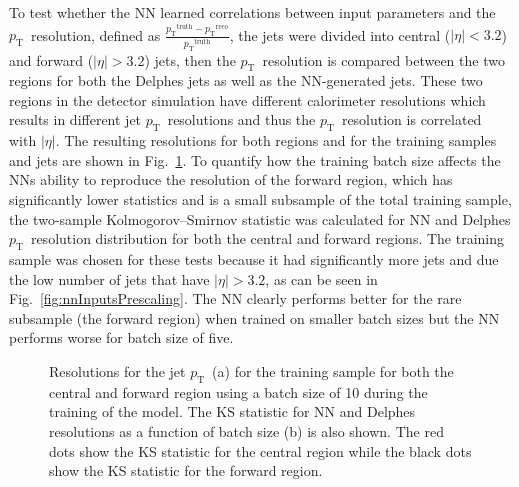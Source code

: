 \documentclass[showpacs,showkeys,preprint,prd,nofootinbib,linenumbers,12pt]{revtex4-1}
\def\pt{\ensuremath{p_{\mathrm{T}}}}
\def\ptRes{\ensuremath{\pt^{\mathrm{truth}}-\pt^{\mathrm{reco}}}}
\begin{document}
To test whether the NN learned correlations between input parameters and the \pt\ resolution, defined as $\frac{\ptRes}{\pt^{\text{truth}}}$, the jets were divided into central ($|\eta|<3.2$) and forward ($|\eta|>3.2$) jets, then the \pt\ resolution is compared between the two regions for both the Delphes jets as well as the NN-generated jets. These two regions in the detector simulation have different calorimeter resolutions which results in different jet \pt\ resolutions and thus the \pt\ resolution is correlated with $|\eta|$. The resulting resolutions for both regions and for the training samples and jets are shown in Fig.~\ref{fig:nnRes}. To quantify how the training batch size affects the NNs ability to reproduce the resolution of the forward region, which has significantly lower statistics and is a small subsample of the total training sample, the two-sample Kolmogorov–Smirnov statistic was calculated for NN and Delphes \pt\ resolution distribution for both the central and forward regions. The training sample was chosen for these tests because it had significantly more jets and due the low number of jets that have $|\eta|>3.2$, as can be seen in Fig.~\ref{fig:nnInputsPrescaling}. The NN clearly performs better for the rare subsample (the forward region) when trained on smaller batch sizes but the NN performs worse for batch size of five.

\begin{figure}[htb]
  \caption{Resolutions for the jet \pt\ (a) for the training sample for both the central and forward region using a batch size of 10 during the training of the model. The KS statistic for NN and Delphes resolutions as a function of batch size (b) is also shown. The red dots show the KS statistic for the central region while the black dots show the KS statistic for the forward region. }
  \label{fig:nnRes}
\end{figure}
\end{document}
